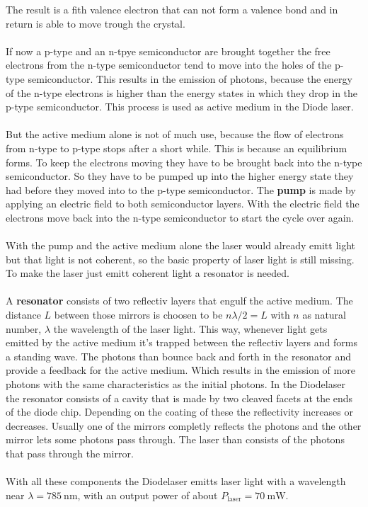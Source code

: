 The result is a fith valence electron that can not form a valence bond and in return is able to move trough the crystal.
\\\\
\FloatBarrier
If now a p-type and an n-tpye semiconductor are brought together the free electrons from the n-type semiconductor tend to move into the holes of the p-type semiconductor.
This results in the emission of photons, because the energy of the n-type electrons is higher than the energy states in which they drop in the p-type semiconductor.
This process is used as active medium in the Diode laser.
\\\\
But the active medium alone is not of much use, because the flow of electrons from n-type to p-type stops after a short while.
This is because an equilibrium forms.
To keep the electrons moving they have to be brought back into the n-type semiconductor.
So they have to be pumped up into the higher energy state they had before they moved into to the p-type semiconductor.
The \textbf{pump} is made by applying an electric field to both semiconductor layers.
With the electric field the electrons move back into the n-type semiconductor to start the cycle over again.
\\\\
With the pump and the active medium alone the laser would already emitt light but that light is not coherent, so the basic property of laser light is still missing.
To make the laser just emitt coherent light a resonator is needed.
\\\\
A \textbf{resonator} consists of two reflectiv layers that engulf the active medium.
The distance $L$ between those mirrors is choosen to be $n \lambda/2 = L$ with $n$ as natural number, $\lambda$ the wavelength of the laser light.
This way, whenever light gets emitted by the active medium it's trapped between the reflectiv layers and forms a standing wave.
The photons than bounce back and forth in the resonator and provide a feedback for the active medium.
Which results in the emission of more photons with the same characteristics as the initial photons.
In the Diodelaser the resonator consists of a cavity that is made by two cleaved facets at the ends of the diode chip.
Depending on the coating of these the reflectivity increases or decreases.
Usually one of the mirrors completly reflects the photons and the other mirror lets some photons pass through.
The laser than consists of the photons that pass through the mirror.
\\\\
With all these components the Diodelaser emitts laser light with a wavelength near $\lambda = \SI{785}{\nano\meter}$, with an output power of about $P_\text{laser} = \SI{70}{\milli\W}$.

